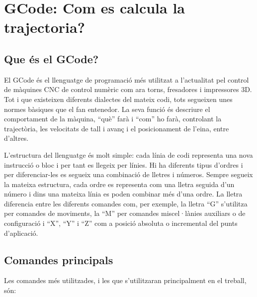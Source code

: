 \section{GCode: Com es calcula la trajectoria?}

\subsection{Que és el GCode?}
El GCode és el llenguatge de programació més utilitzat a l'actualitat pel control de màquines CNC de control numèric com ara torns, fresadores i impressores 3D. Tot i que existeixen diferents dialectes del mateix codi, tots segueixen unes normes bàsiques que el fan entenedor. La seva funció és descriure el comportament de la màquina, “què” farà i “com” ho farà, controlant la trajectòria, les velocitats de tall i avanç i el posicionament de l'eina, entre d'altres.

L'estructura del llenguatge és molt simple: cada línia de codi representa una nova instrucció o bloc i per tant es llegeix per línies. Hi ha diferents tipus d'ordres i per diferenciar-les es segueix una combinació de lletres i números. Sempre segueix la mateixa estructura, cada ordre es representa com una lletra seguida d'un número i dins una mateixa línia es poden combinar més d'una ordre. La lletra diferencia entre les diferents comandes com, per exemple, la lletra “G” s'utilitza per comandes de moviments, la “M” per comandes miscel·lànies auxiliars o de configuració i “X”, “Y” i “Z” com a posició absoluta o incremental del punts d'aplicació.  

\subsection{Comandes principals}
Les comandes més utilitzades, i les que s'utilitzaran principalment en el treball, són:

